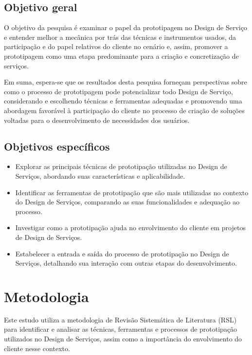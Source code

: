 \subsection{Objetivo geral}

O objetivo da pesquisa é examinar o papel da prototipagem no Design de Serviço e entender melhor a mecânica por trás das técnicas e instrumentos usados, da participação e do papel relativos do cliente no cenário e, assim, promover a prototipagem como uma etapa predominante para a criação e concretização de serviços.

Em suma, espera-se que os resultados desta pesquisa forneçam perspectivas sobre como o processo de prototipagem pode potencializar todo Design de Serviço, considerando e escolhendo técnicas e ferramentas adequadas e promovendo uma abordagem favorável à participação do cliente no processo de criação de soluções voltadas para o desenvolvimento de necessidades dos usuários.

\subsection{Objetivos específicos}

\begin{itemize}
	\item Explorar as principais técnicas de prototipação utilizadas no Design de Serviços, abordando suas características e aplicabilidade.
	
	\item Identificar as ferramentas de prototipação que são mais utilizadas no contexto do Design de Serviços, comparando as suas funcionalidades e adequação ao processo.
	
	\item Investigar como a prototipação ajuda no envolvimento do cliente em projetos de Design de Serviços.
	
	\item Estabelecer a entrada e saída do processo de prototipação no Design de Serviços, detalhando sua interação com outras etapas do desenvolvimento.
\end{itemize}

\section{Metodologia}

Este estudo utiliza a metodologia de Revisão Sistemática de Literatura (RSL) para identificar e analisar as técnicas, ferramentas e processos de prototipação utilizados no Design de Serviços, assim como a importância do envolvimento do cliente nesse contexto. 

